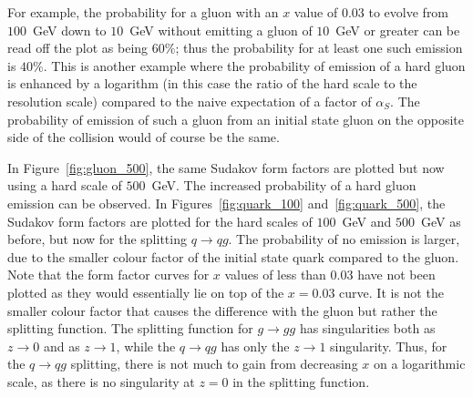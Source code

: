 \documentclass[12pt]{iopart}
\def\as{\alpha_S}
\begin{document}
For example, the probability for a gluon with an $x$ value of $0.03$ to evolve from $100$~GeV down to $10$~GeV
without emitting a gluon of $10$~GeV or greater can be read off the plot as being $60\%$; thus the probability for at
least one such emission is $40\%$. This is another example where the probability of emission of a hard gluon is
enhanced by a logarithm (in this case the ratio of the hard scale to the resolution scale) compared to the naive
expectation of a factor of $\as$. The probability of emission of such a gluon from an initial state gluon on
the opposite side of the collision would of course be the same. 

In Figure~\ref{fig:gluon_500}, the same Sudakov form factors are plotted but now using a hard
scale of $500$~GeV. The increased probability of a hard gluon emission can be observed. In
Figures~\ref{fig:quark_100} and~\ref{fig:quark_500}, the Sudakov form factors are plotted for the
hard scales of $100$~GeV and $500$~GeV as before, but now for  the splitting $q \rightarrow qg$.
The probability of no emission is larger, due to the smaller colour factor of the initial state
quark compared to the gluon.  Note that the form factor curves for $x$ values of less than $0.03$
have not been plotted as they would essentially lie on top of the $x=0.03$ curve. It is not the
smaller colour factor that causes the difference with the gluon but rather the splitting function.
The splitting function for $g \rightarrow gg$ has singularities both as $z \rightarrow 0$ and as
$z \rightarrow 1$, while the $q \rightarrow qg$ has only the $z \rightarrow 1$ singularity.  Thus,
for the $q \rightarrow qg$ splitting, there  is not much to gain from decreasing $x$ on a
logarithmic scale, as there is no singularity at $z=0$ in  the splitting function. 
\end{document}
